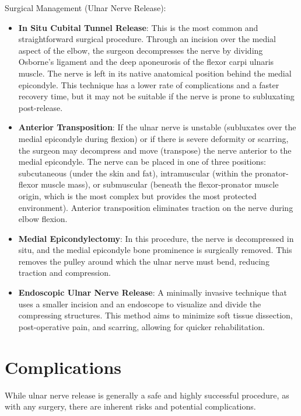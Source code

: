 Surgical Management (Ulnar Nerve Release):
\begin{itemize}
  \item \textbf{In Situ Cubital Tunnel Release}: This is the most common and straightforward surgical procedure. Through an incision over the medial aspect of the elbow, the surgeon decompresses the nerve by dividing Osborne's ligament and the deep aponeurosis of the flexor carpi ulnaris muscle. The nerve is left in its native anatomical position behind the medial epicondyle. This technique has a lower rate of complications and a faster recovery time, but it may not be suitable if the nerve is prone to subluxating post-release.
  \item \textbf{Anterior Transposition}: If the ulnar nerve is unstable (subluxates over the medial epicondyle during flexion) or if there is severe deformity or scarring, the surgeon may decompress and move (transpose) the nerve anterior to the medial epicondyle. The nerve can be placed in one of three positions: subcutaneous (under the skin and fat), intramuscular (within the pronator-flexor muscle mass), or submuscular (beneath the flexor-pronator muscle origin, which is the most complex but provides the most protected environment). Anterior transposition eliminates traction on the nerve during elbow flexion.
  \item \textbf{Medial Epicondylectomy}: In this procedure, the nerve is decompressed in situ, and the medial epicondyle bone prominence is surgically removed. This removes the pulley around which the ulnar nerve must bend, reducing traction and compression.
  \item \textbf{Endoscopic Ulnar Nerve Release}: A minimally invasive technique that uses a smaller incision and an endoscope to visualize and divide the compressing structures. This method aims to minimize soft tissue dissection, post-operative pain, and scarring, allowing for quicker rehabilitation.
\end{itemize}

\section*{Complications}
While ulnar nerve release is generally a safe and highly successful procedure, as with any surgery, there are inherent risks and potential complications.

